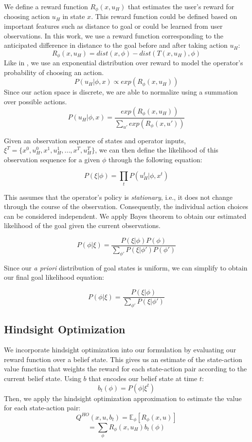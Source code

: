 \documentclass[conference]{IEEEtran}
\begin{document}
We define a reward function $R_\phi (x, u_H)$ that estimates the user's reward for choosing action $u_H$ in state $x$. This reward function could be defined based on important features such as distance to goal or could be learned from user observations. In this work, we use a reward function corresponding to the anticipated difference in distance to the goal before and after taking action $u_H$: 
\[
R_\phi (x, u_H) = dist(x, \phi) - dist(T(x, u_H), \phi)
\]
Like in \cite{ramachandran2007bayesian}, we use an exponential distribution over reward to model the operator's probability of choosing an action.
\[
P(u_H|\phi, x) \propto exp(R_\phi (x, u_H))
\]
Since our action space is discrete, we are able to normalize using a summation over possible actions.
\[
P(u_H|\phi, x) = \frac{exp(R_\phi (x, u_H))}{\sum_{u'} exp(R_\phi (x, u'))}
\]

Given an observation sequence of states and operator inputs, $\xi^T = \{x^0, u_H^0, x^1, u_H^1, ..., x^T, u_H^T\}$, we can then define the likelihood of this observation sequence for a given $\phi$ through the following equation:

\[
P(\xi|\phi) = \prod_tP(u_H^t|\phi, x^t)
\]

This assumes that the operator's policy is \textit{stationary}, i.e., it does not change through the course of the observation. Consequently, the individual action choices can be considered independent. We apply Bayes theorem to obtain our estimated likelihood of the goal given the current observations.

\[
P(\phi|\xi) = \frac{P(\xi|\phi)P(\phi)}{\sum_{\phi'}P(\xi|\phi')P(\phi')}
\]

Since our \textit{a priori} distribution of goal states is uniform, we can simplify to obtain our final goal likelihood equation:

\[
P(\phi|\xi) = \frac{P(\xi|\phi)}{\sum_{\phi'}P(\xi|\phi')}
\]

\subsection{Hindsight Optimization}

We incorporate hindsight optimization \cite{javdani2015shared} into our formulation by evaluating our reward function over a belief state. This gives us an estimate of the state-action value function that weights the reward for each state-action pair according to the current belief state. Using $b$ that encodes our belief state at time $t$:
\[
b_t(\phi) = P(\phi|\xi^t)
\]
Then, we apply the hindsight optimization approximation to estimate the value for each state-action pair:
\[
Q^{HO}(x,u,b_t) = \mathbb{E}_\phi[R_\phi (x, u)]
\]
\[
=\sum_\phi R_\phi (x, u_H)b_t(\phi)
\]
\end{document}
